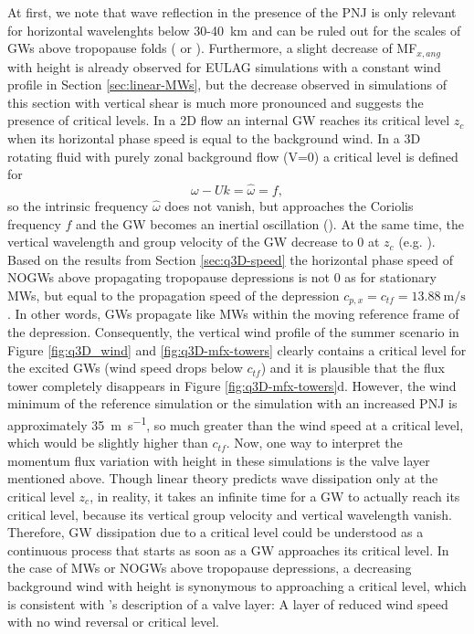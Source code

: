At first, we note that wave reflection in the presence of the PNJ is only relevant for horizontal wavelenghts below 30-\SI{40}{\kilo\meter} and can be ruled out for the scales of GWs above tropopause folds (\cite[]{gill_atmosphere-ocean_1982} or \cite[]{mixa_nonlinear_2021}). Furthermore, a slight decrease of MF$_{x,ang}$ with height is already observed for EULAG simulations with a constant wind profile in Section \ref{sec:linear-MWs}, but the decrease observed in simulations of this section with vertical shear is much more pronounced and suggests the presence of critical levels. In a 2D flow an internal GW reaches its critical level $z_c$ when its horizontal phase speed is equal to the background wind. In a 3D rotating fluid with purely zonal background flow (V=0) a critical level is defined for 
\begin{equation}
    \omega - Uk = \hat{\omega} = f,
    \label{equ:critical_level}
\end{equation}
so the intrinsic frequency $\hat{\omega}$ does not vanish, but approaches the Coriolis frequency $f$ and the GW becomes an inertial oscillation (\cite{jones_propagation_1967}). At the same time, the vertical wavelength and group velocity of the GW decrease to 0 at $z_c$ (e.g. \cite[]{lin_mesoscale_2007}). Based on the results from Section \ref{sec:q3D-speed} the horizontal phase speed of NOGWs above propagating tropopause depressions is not 0 as for stationary MWs, but equal to the propagation speed of the depression $c_{p,x}=c_{tf}=\SI{13.88}{\meter\per\second}$. In other words, GWs propagate like MWs within the moving reference frame of the depression. Consequently, the vertical wind profile of the summer scenario in Figure \ref{fig:q3D_wind} and \ref{fig:q3D-mfx-towers} clearly contains a critical level for the excited GWs (wind speed drops below $c_{tf}$) and it is plausible that the flux tower completely disappears in Figure \ref{fig:q3D-mfx-towers}d. However, the wind minimum of the reference simulation or the simulation with an increased PNJ is approximately \SI{35}{\meter\per\second}, so much greater than the wind speed at a critical level, which would be slightly higher than $c_{tf}$. Now, one way to interpret the momentum flux variation with height in these simulations is the valve layer mentioned above. Though linear theory predicts wave dissipation only at the critical level $z_c$, in reality, it takes an infinite time for a GW to actually reach its critical level, because its vertical group velocity and vertical wavelength vanish. Therefore, GW dissipation due to a critical level could be understood as a continuous process that starts as soon as a GW approaches its critical level. In the case of MWs or NOGWs above tropopause depressions, a decreasing background wind with height is synonymous to approaching a critical level, which is consistent with \textcite[]{kruse_midlatitude_2016}'s description of a valve layer: A layer of reduced wind speed with no wind reversal or critical level. \\
